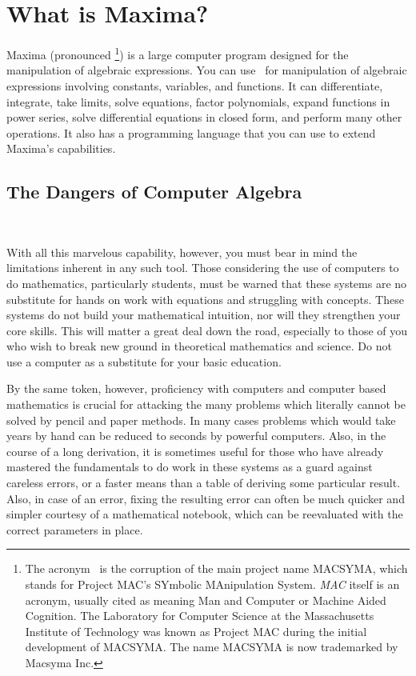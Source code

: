 
\section{What is Maxima?}

Maxima (pronounced \maxp\footnote{The acronym \Max\ is the corruption of the main project name MACSYMA, which  stands for Project MAC's 
SYmbolic MAnipulation System. {\it MAC} itself is an acronym, usually 
cited as meaning Man and Computer or Machine Aided Cognition. The
Laboratory for Computer Science at the Massachusetts Institute of Technology
was known as Project MAC during the initial development of MACSYMA.  The name
MACSYMA is now trademarked by Macsyma Inc.})
is a large computer program designed for the manipulation
of algebraic expressions. You can use \Max\
for manipulation of algebraic expressions involving
constants, variables, and functions. It can
differentiate, integrate, take limits, solve equations,
factor polynomials, expand functions in power series, solve differential 
equations in closed form, and perform many other
operations.  It also has a programming language that you can use to 
extend Maxima's capabilities.


\subsection*{The Dangers of Computer Algebra}

~

With all this marvelous capability, however, you must bear in mind the 
limitations inherent in any such tool.  Those considering the use of 
computers to do mathematics, particularly
students, must be warned that these systems are no substitute for
hands on work with equations and struggling with concepts. These systems
do not build your mathematical intuition, nor will they strengthen
your core skills. This will matter a great deal down the road, especially
to those of you who wish to break new ground in theoretical mathematics
and science. Do not use a computer as a substitute for your basic
education.

By the same token, however, proficiency with computers and computer
based mathematics is crucial for attacking the many problems which
literally cannot be solved by pencil and paper methods. In many cases
problems which would take years by hand can be reduced to seconds
by powerful computers. Also, in the course of a long derivation, it
is sometimes useful for those who have already mastered the fundamentals
to do work in these systems as a guard against careless errors, or
a faster means than a table of deriving some particular result. Also,
in case of an error, fixing the resulting error can often be much
quicker and simpler courtesy of a mathematical notebook, which can
be reevaluated with the correct parameters in place.

